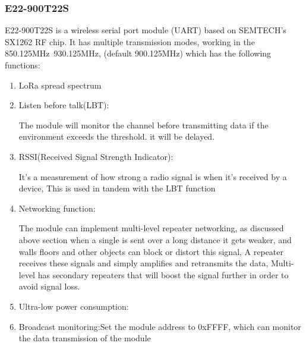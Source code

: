 \subsubsection{E22-900T22S}
E22-900T22S is a wireless serial port module (UART) based on SEMTECH's SX1262 RF chip. It has multiple transmission modes, working in the 850.125MHz~930.125MHz, (default 900.125MHz) which has the following functions:
\begin{enumerate}
    \item LoRa spread spectrum
    \item Listen before talk(LBT):

    The module will monitor the channel before transmitting data if the environment exceeds the threshold. it will be delayed.
    \item RSSI(Received Signal Strength Indicator):
    
    It's a measurement of how strong a radio signal is when it's received by a device, This is used in tandem with the LBT function

    \item Networking function: 
    
    The module can implement multi-level repeater networking, 
    as discussed above section when a single is sent over a long distance it gets weaker, and walls floors and other objects can block or distort this signal, A repeater receives these signals and simply amplifies and retransmits the data, Multi-level has secondary repeaters that will boost the signal further in order to avoid signal loss.
    \item Ultra-low power consumption:
    \item Broadcast monitoring:Set the module address to 0xFFFF, which can monitor the data transmission of the module
\end{enumerate}